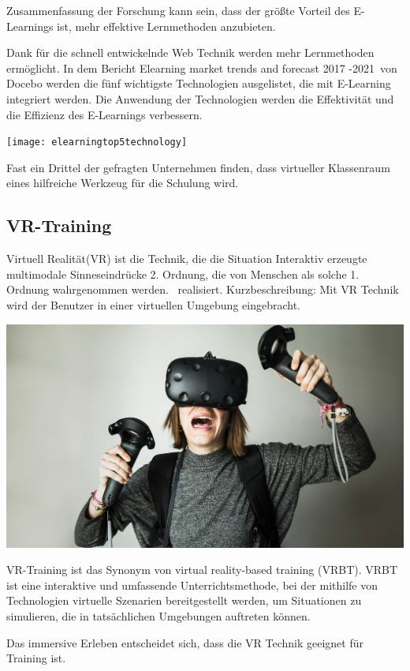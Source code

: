 Zusammenfassung der Forschung kann sein, dass der größte Vorteil des E-Learnings ist, mehr effektive Lernmethoden anzubieten.

Dank für die schnell entwickelnde Web Technik werden mehr Lernmethoden ermöglicht. In dem Bericht \glqq Elearning market trends and forecast 2017 -2021\grqq\ von Docebo werden die fünf wichtigste Technologien ausgelistet, die mit E-Learning integriert werden. Die Anwendung der Technologien werden die Effektivität und die Effizienz des E-Learnings verbessern.

\texttt{[image: elearningtop5technology]}

Fast ein Drittel der gefragten Unternehmen finden, dass virtueller Klassenraum eines hilfreiche Werkzeug für die Schulung wird.

 \subsection{VR-Training}
 
Virtuell Realität(VR) ist die Technik, die die Situation \glqq Interaktiv erzeugte multimodale Sinneseindrücke 2. Ordnung, die von Menschen als solche 1. Ordnung wahrgenommen werden.\grqq\ \citep{9} realisiert. Kurzbeschreibung: Mit VR Technik wird der Benutzer in einer virtuellen Umgebung eingebracht.

\includegraphics[width=\textwidth]{images/vrhtcvive.jpg}

VR-Training ist das Synonym von virtual reality-based training (VRBT). \glqq VRBT ist eine interaktive und umfassende Unterrichtsmethode, bei der mithilfe von Technologien virtuelle Szenarien bereitgestellt werden, um Situationen zu simulieren, die in tatsächlichen Umgebungen auftreten können. \grqq\ \citep{14}

Das immersive Erleben entscheidet sich, dass die VR Technik geeignet für Training ist.

